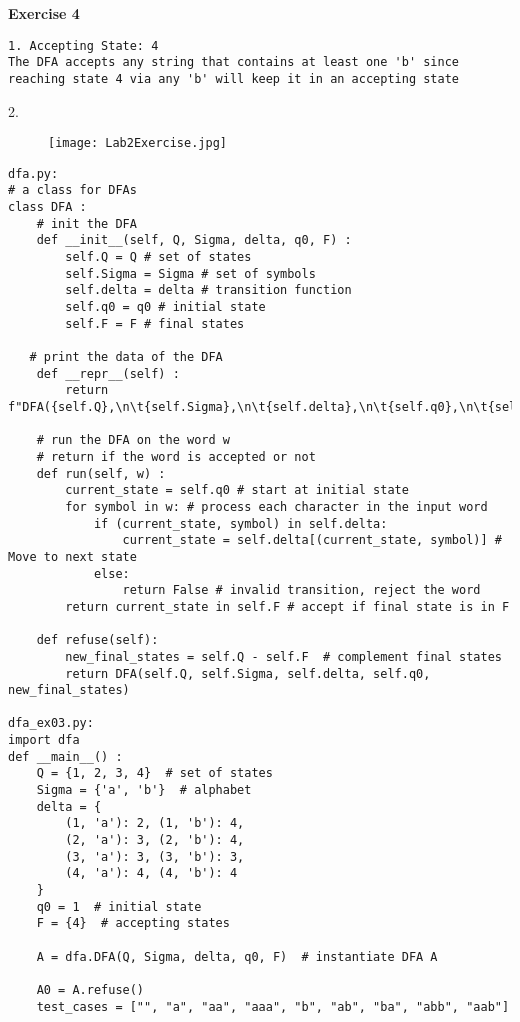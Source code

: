 \documentclass{article}
\theoremstyle{theorem}
\theoremstyle{definition}
\theoremstyle{remark}
\begin{document}
\textbf{Exercise 4} 
\begin{lstlisting}
1. Accepting State: 4
The DFA accepts any string that contains at least one 'b' since reaching state 4 via any 'b' will keep it in an accepting state
\end{lstlisting}

2. \begin{figure}[h] %
    \centering
    \texttt{[image: Lab2Exercise.jpg]} %
    \caption{}
\end{figure}

\begin{lstlisting}
dfa.py:
# a class for DFAs
class DFA :
    # init the DFA
    def __init__(self, Q, Sigma, delta, q0, F) : 
        self.Q = Q # set of states
        self.Sigma = Sigma # set of symbols
        self.delta = delta # transition function
        self.q0 = q0 # initial state
        self.F = F # final states
   
   # print the data of the DFA
    def __repr__(self) :
        return f"DFA({self.Q},\n\t{self.Sigma},\n\t{self.delta},\n\t{self.q0},\n\t{self.F})"

    # run the DFA on the word w
    # return if the word is accepted or not
    def run(self, w) :
        current_state = self.q0 # start at initial state
        for symbol in w: # process each character in the input word
            if (current_state, symbol) in self.delta:
                current_state = self.delta[(current_state, symbol)] # Move to next state
            else:
                return False # invalid transition, reject the word
        return current_state in self.F # accept if final state is in F       

    def refuse(self):
        new_final_states = self.Q - self.F  # complement final states
        return DFA(self.Q, self.Sigma, self.delta, self.q0, new_final_states)

dfa_ex03.py:
import dfa
def __main__() :
    Q = {1, 2, 3, 4}  # set of states
    Sigma = {'a', 'b'}  # alphabet
    delta = {
        (1, 'a'): 2, (1, 'b'): 4,
        (2, 'a'): 3, (2, 'b'): 4,
        (3, 'a'): 3, (3, 'b'): 3,
        (4, 'a'): 4, (4, 'b'): 4
    }
    q0 = 1  # initial state
    F = {4}  # accepting states

    A = dfa.DFA(Q, Sigma, delta, q0, F)  # instantiate DFA A
    
    A0 = A.refuse()
    test_cases = ["", "a", "aa", "aaa", "b", "ab", "ba", "abb", "aab"]
    

\end{lstlisting}
\end{document}
